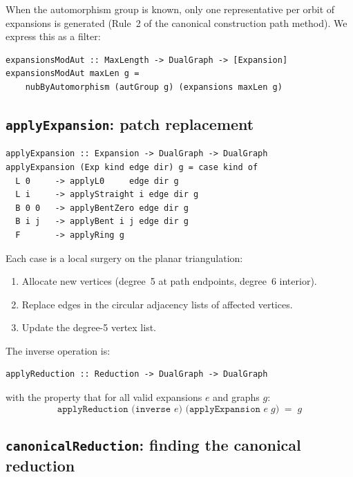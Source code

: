 \documentclass[11pt,a4paper]{article}
\theoremstyle{definition}
\begin{document}
When the automorphism group is known, only one representative per orbit
of expansions is generated (Rule~2 of the canonical construction path
method).  We express this as a filter:

\begin{lstlisting}
expansionsModAut :: MaxLength -> DualGraph -> [Expansion]
expansionsModAut maxLen g =
    nubByAutomorphism (autGroup g) (expansions maxLen g)
\end{lstlisting}

\subsection{\texttt{applyExpansion}: patch replacement}

\begin{lstlisting}
applyExpansion :: Expansion -> DualGraph -> DualGraph
applyExpansion (Exp kind edge dir) g = case kind of
  L 0     -> applyL0     edge dir g
  L i     -> applyStraight i edge dir g
  B 0 0   -> applyBentZero edge dir g
  B i j   -> applyBent i j edge dir g
  F       -> applyRing g
\end{lstlisting}

Each case is a local surgery on the planar triangulation:
\begin{enumerate}[nosep]
  \item Allocate new vertices (degree~5 at path endpoints, degree~6
    interior).
  \item Replace edges in the circular adjacency lists of affected
    vertices.
  \item Update the degree-5 vertex list.
\end{enumerate}

The inverse operation is:
\begin{lstlisting}
applyReduction :: Reduction -> DualGraph -> DualGraph
\end{lstlisting}
with the property that for all valid expansions $e$ and graphs $g$:
\[
  \texttt{applyReduction (inverse } e\texttt{) (applyExpansion } e \; g\texttt{)} \;=\; g
\]

\subsection{\texttt{canonicalReduction}: finding the canonical reduction}
\end{document}
